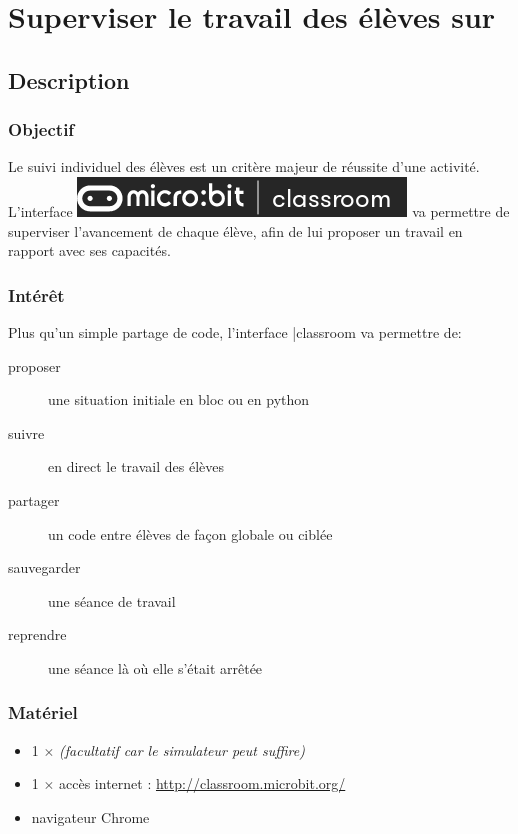 

\section{Superviser le travail des élèves sur \mb}


\subsection{Description}

\subsubsection{Objectif}


\begin{formule}
Le suivi individuel des élèves est un critère majeur de réussite d'une activité. 
L'interface \includegraphics[scale=0.3]{res/classroom_logo.png} va permettre de superviser 
l'avancement de chaque élève, afin de lui proposer un travail en rapport avec ses capacités.
\end{formule}


\subsubsection{Intérêt}

Plus qu'un simple partage de code, l'interface \mb |classroom va permettre de:

\begin{description}
    \item [proposer] une situation initiale en bloc ou en python
    \item [suivre] en direct le travail des élèves
    \item [partager] un code entre élèves de façon globale ou ciblée
    \item [sauvegarder] une séance de travail
    \item [reprendre] une séance là où elle s'était arrêtée
\end{description}


\subsubsection{Matériel}
\begin{itemize}
    \item 1 $\times$ \matosMb \emph{(facultatif car le simulateur peut suffire)}
    \item 1 $\times$ accès internet : \url{http://classroom.microbit.org/}
%   
    \item navigateur Chrome\textregistered
\end{itemize}



